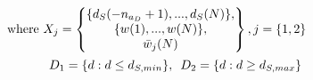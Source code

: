\documentclass[letterpaper, 10 pt, conference]{ieeeconf}  %
\begin{document}
	\normalsize
	\vspace{-5pt}
	\begin{equation*}
	\hspace{-30pt}
	\begin{matrix}
	\text{where } \small
	X_j = 
	\begin{Bmatrix}
	\{d_S(-n_{a_D}+1),...,d_S(N)\},\\
	\{w(1),...,w(N)\},\vspace{0.001cm}\\
	\bar{w}_j(N)
	\end{Bmatrix}, j=\{1,2\}
	\vspace{5pt}\\
	\begin{matrix} 
	\hspace{30pt}
	D_1 = \{d:d \leq d_{S,min}\}, \hspace{5pt}
	D_2 = \{d:d \geq d_{S,max}\}
	\end{matrix}
	\end{matrix}
	\end{equation*}
	\normalsize
	
\end{document}
